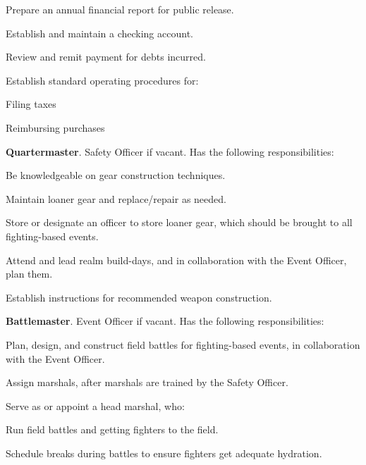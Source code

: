 \documentclass[12pt]{article}
\begin{document}
\begin{level}
\begin{level}
\begin{level}
        \item Prepare an annual financial report for public release.
        \item Establish and maintain a checking account.
        \item Review and remit payment for debts incurred.
        \item Establish standard operating procedures for:
        \begin{level}
            \item Filing taxes
            \item Reimbursing purchases
        \end{level}
    \end{level}
    \item \textbf{Quartermaster}. Safety Officer if vacant. Has the following responsibilities:
    \begin{level}
        \item Be knowledgeable on gear construction techniques.
        \item Maintain loaner gear and replace/repair as needed.
        \item Store or designate an officer to store loaner gear, which should be brought to all fighting-based events.
        \item Attend and lead realm build-days, and in collaboration with the Event Officer, plan them.
        \item Establish instructions for recommended weapon construction.
    \end{level}
    \item \textbf{Battlemaster}. Event Officer if vacant. Has the following responsibilities:
    \begin{level}
        \item Plan, design, and construct field battles for fighting-based events, in collaboration with the Event Officer.
        \item Assign marshals, after marshals are trained by the Safety Officer.
        \item Serve as or appoint a head marshal, who:
        \begin{level}
            \item Run field battles and getting fighters to the field.
            \item Schedule breaks during battles to ensure fighters get adequate hydration.
        \end{level}
    \end{level}

\end{level}
\end{level}
\end{document}
